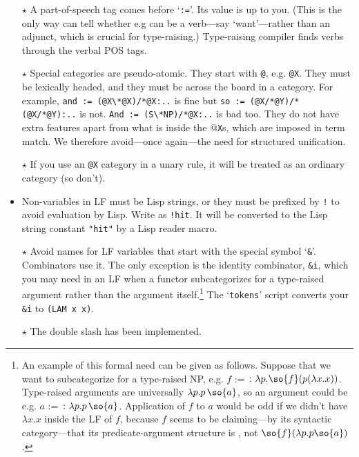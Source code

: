 \documentclass[11pt]{article}
\begin{document}
{\begin{itemize}
\verb|(d-shift) vp : lf --> vp/(vp\vp) : \lf\q. q lf;|

\item[$\star$]  A part-of-speech tag comes before `\verb|:=|'. Its value is up to you.
(This is the only way  can tell whether e.g  can be a verb---say `want'---rather than an adjunct,
which is crucial for type-raising.) {Type-raising compiler finds verbs through the verbal POS tags.}
\item[$\star$] Special categories are pseudo-atomic. They start with \verb|@|, e.g. \verb|@X|. They must be lexically headed, and they must be across the board in a category. For example,
\verb|and := (@X\*@X)/*@X:..| is fine but \verb|so := (@X/*@Y)/*(@X/*@Y):..| is not. 
\verb|And := (S\*NP)/*@X:..|
is bad too. {They do not have extra features apart from
what is inside the @\verb+X+s, which are imposed in term match.}
We therefore avoid---once again---the need for structured unification.
\item[$\star$] If you use an \verb|@X| category in a unary rule, it will be treated as an ordinary category (so don't).
\item Non-variables in LF must be Lisp strings, or they must be prefixed by \verb+!+ to avoid evaluation by Lisp. Write  as \verb|!hit|. It will be converted to the Lisp string constant \verb|"hit"| by a Lisp reader macro. 
\item[$\star$] Avoid names for LF variables that start with the special symbol `\verb|&|'. Combinators use it.
The only exception is the identity combinator, \verb|&i|, which you may need in an LF when a functor subcategorizes
for a type-raised argument rather than the argument itself.\footnote{\label{fn:i}An example of this formal need can be given as follows.
Suppose that we want to subcategorize for a type-raised NP, e.g. $f$ := $\colon \lambda p.\so{f} (p (\lambda x.x))$. Type-raised arguments are universally $\lambda p.p\,\so{a}$, so an argument could be e.g. $a$ := $\colon
\lambda p.p\,\so{a}$. Application of $f$ to $a$ would be odd if we didn't have $\lambda x.x$ inside the LF of $f$,
because $f$ seems to be claiming---by its syntactic category---that its predicate-argument structure is , not $\so{f}(\lambda p.p \so{a})$.}
The `\verb|tokens|' script converts your \verb|&i| to \verb|(LAM x x)|.
\item[$\star$] {The double slash has been implemented.
}
\end{itemize}}
\end{document}
